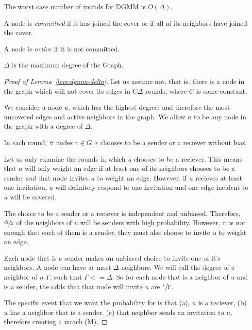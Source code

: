 \begin{lem}
  \label{lem:dgmm-delta}
  The worst case number of rounds for DGMM is $O(\Delta)$.
\end{lem}
\begin{ldef}
A node is {\em committed} if it has joined the cover or if all of its neighbors have joined the cover.
\end{ldef}
\begin{ldef}
A node is {\em active} if it is not committed.
\end{ldef}
\begin{ldef}
$\Delta$ is the maximum degree of the Graph.
\end{ldef}
\begin{proof}[Proof of Lemma~\ref{lem:dgmm-delta}]
Let us assume not, that is, there is a node in the graph which will not cover its edges in $C\Delta$ rounds, where $C$ is some constant.

We consider a node $u$, which has the highest degree, and therefore the most uncovered edges and active neighbors in the graph. We allow $u$ to be any node in the graph with a degree of $\Delta$.

In each round, $\forall \text{ nodes } v \in G, v$ chooses to be a sender or a reciever without bias. 

Let us only examine the rounds in which $u$ chooses to be a reciever. This means that $u$ will only weight an edge if at least one of its neighbors chooses to be a sender {\em and} that node invites $u$ to weight an edge. However, if $u$ recieves at least one invitation, $u$ will definitely respond to one invitation and one edge incident to $u$ will be covered.

The choice to be a sender or a reciever is independent and unbiased. Therefore, $\sfrac{\Delta}{2}$ of the neighbors of $u$ will be senders with high probability. However, it is not enough that each of them is a sender, they must also choose to invite $u$ to weight an edge.

Each node that is a sender makes an unbiased choice to invite one of it's neighbors. A node can have at most $\Delta$ neighbors. We will call the degree of a neighbor of $u$ $\Gamma$, such that $\Gamma <= \Delta$. So for each node that is a neighbor of $u$ and is a sender, the odds that that node will invite $u$ are $\sfrac{1}{\Gamma}$.

The specific event that we want the probability for is that (a), $u$ is a reciever, (b) $u$ has a neighbor that is a sender, (c) that neighbor sends an invitation to $u$, therefore creating a match (M).


\end{proof}

